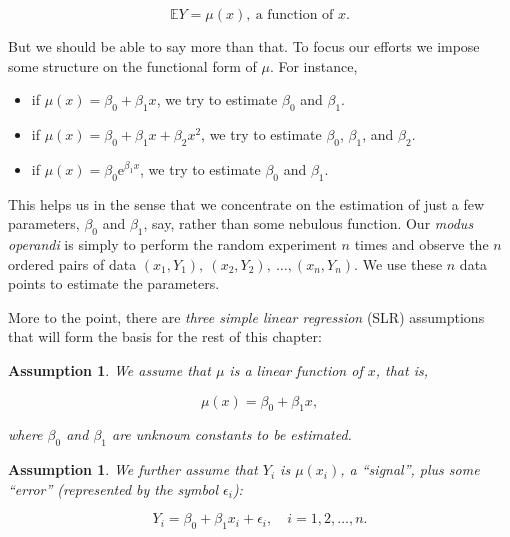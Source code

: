 \documentclass[]{book}
\providecommand{\tightlist}{%
  \setlength{\itemsep}{0pt}\setlength{\parskip}{0pt}}
\numberwithin{equation}{chapter}
\numberwithin{figure}{chapter}
\theoremstyle{plain}
\newtheorem{assumption}[thm]{Assumption}
\theoremstyle{definition}
\theoremstyle{remark}
\theoremstyle{definition}
\theoremstyle{definition}
\theoremstyle{remark}
\begin{document}
\begin{equation}
\mathbb{E} Y = \mu(x),\ \mbox{a function of }x.
\end{equation}

But we should be able to say more than that. To focus our efforts we
impose some structure on the functional form of \(\mu\). For instance,

\begin{itemize}
\tightlist
\item
  if \(\mu(x)=\beta_{0}+\beta_{1}x\), we try to estimate \(\beta_{0}\)
  and \(\beta_{1}\).
\item
  if \(\mu(x) = \beta_{0} + \beta_{1}x + \beta_{2}x^{2}\), we try to
  estimate \(\beta_{0}\), \(\beta_{1}\), and \(\beta_{2}\).
\item
  if \(\mu(x) = \beta_{0} \mathrm{e}^{\beta_{1}x}\), we try to estimate
  \(\beta_{0}\) and \(\beta_{1}\).
\end{itemize}

This helps us in the sense that we concentrate on the estimation of just
a few parameters, \(\beta_{0}\) and \(\beta_{1}\), say, rather than some
nebulous function. Our \emph{modus operandi} is simply to perform the
random experiment \(n\) times and observe the \(n\) ordered pairs of
data \((x_{1},Y_{1}),\ (x_{2},Y_{2}),\ \ldots,(x_{n},Y_{n})\). We use
these \(n\) data points to estimate the parameters.

More to the point, there are \emph{three simple linear regression} (SLR)
assumptions  that will form the basis for
the rest of this chapter:

\bigskip

\begin{assumption}
We assume that \(\mu\) is a linear function of \(x\), that is,

\begin{equation}
\mu(x)=\beta_{0}+\beta_{1}x,
\end{equation}

where \(\beta_{0}\) and \(\beta_{1}\) are unknown constants to be
estimated. \bigskip
\end{assumption}\begin{assumption}
We further assume that \(Y_{i}\) is \(\mu(x_{i})\), a ``signal'', plus
some ``error'' (represented by the symbol \(\epsilon_{i}\)):

\begin{equation}
Y_{i} = \beta_{0} + \beta_{1}x_{i} + \epsilon_{i}, \quad i = 1,2,\ldots,n.
\end{equation}
\end{assumption}
\end{document}
